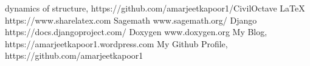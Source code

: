\begin{thebibliography}{9}
\bibitem{} dynamics of structure, https://github.com/amarjeetkapoor1/CivilOctave
\bibitem{} \LaTeX{} https://www.sharelatex.com
\bibitem{} Sagemath www.sagemath.org/
\bibitem{} Django https://docs.djangoproject.com/
\bibitem{} Doxygen www.doxygen.org
\bibitem{} My Blog, https://amarjeetkapoor1.wordpress.com
\bibitem{} My Github Profile, https://github.com/amarjeetkapoor1
\end{thebibliography}
